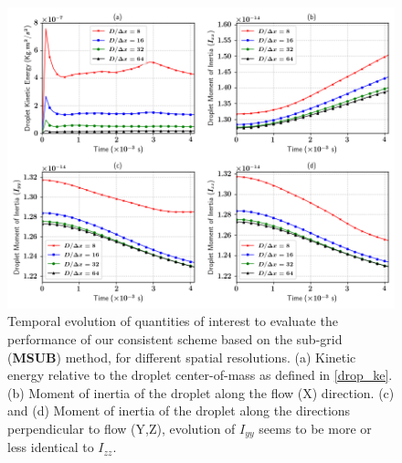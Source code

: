 \begin{figure}
\begin{center}
\includegraphics[width = 1.5\textwidth]{plots/raindrop/jcp_1.png}
\end{center}
\vspace*{-0.5cm}
\caption{Temporal evolution of quantities of interest to evaluate the 
	performance of our consistent scheme based on the 
	sub-grid (\textbf{MSUB}) method, for different spatial resolutions. 
	(a) Kinetic energy relative to the droplet center-of-mass as defined in \eqref{drop_ke}. 
	(b) Moment of inertia of the droplet along the flow (X) direction. 
	(c) and (d) Moment of inertia of the droplet along the directions 
	perpendicular to flow (Y,Z), evolution of $I_{yy}$ 
	seems to be more or less identical to $I_{zz}$.}
\label{multi_jcp}
\end{figure}

